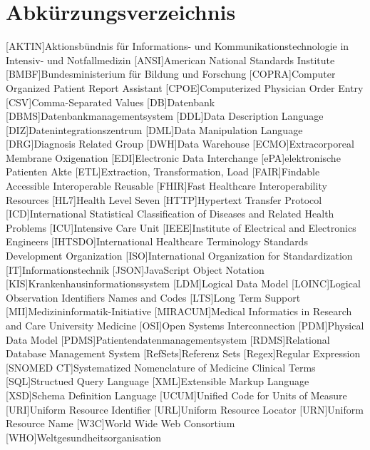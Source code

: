 \chapter*{Abkürzungsverzeichnis}

\begin{acronym}[ABK]
	[AKTIN]{Aktionsbündnis für Informations- und Kommunikationstechnologie in Intensiv- und Notfallmedizin}
	[ANSI]{American National Standards Institute}
	[BMBF]{Bundesministerium für Bildung und Forschung}
	[COPRA]{Computer Organized Patient Report Assistant}
	[CPOE]{Computerized Physician Order Entry}
	[CSV]{Comma-Separated Values}
	[DB]{Datenbank}
	[DBMS]{Datenbankmanagementsystem}
	[DDL]{Data Description Language}
	[DIZ]{Datenintegrationszentrum}
	[DML]{Data Manipulation Language}
	[DRG]{Diagnosis Related Group}
	[DWH]{Data Warehouse}
	[ECMO]{Extracorporeal Membrane Oxigenation}
	[EDI]{Electronic Data Interchange}
	[ePA]{elektronische Patienten Akte}
	[ETL]{Extraction, Transformation, Load}
	[FAIR]{Findable Accessible Interoperable Reusable}
	[FHIR]{Fast Healthcare Interoperability Resources}
	[HL7]{Health Level Seven}
	[HTTP]{Hypertext Transfer Protocol}
	[ICD]{International Statistical Classification of Diseases and Related Health Problems}
	[ICU]{Intensive Care Unit}
	[IEEE]{Institute of Electrical and Electronics Engineers}
	[IHTSDO]{International Healthcare Terminology Standards Development Organization}
	[ISO]{International Organization for Standardization}
	[IT]{Informationstechnik}
	[JSON]{JavaScript Object Notation}
	[KIS]{Krankenhausinformationssystem}
	[LDM]{Logical Data Model}
	[LOINC]{Logical Observation Identifiers Names and Codes}
	[LTS]{Long Term Support}
	[MII]{Medizininformatik-Initiative}
	[MIRACUM]{Medical Informatics in Research and Care University Medicine}
	[OSI]{Open Systems Interconnection}
	[PDM]{Physical Data Model}
	[PDMS]{Patientendatenmanagementsystem}
	[RDMS]{Relational Database Management System}
	[RefSets]{Referenz Sets}
	[Regex]{Regular Expression}
	[SNOMED CT]{Systematized Nomenclature of Medicine Clinical Terms}
	[SQL]{Structued Query Language}
	[XML]{Extensible Markup Language}
	[XSD]{Schema Definition Language}
	[UCUM]{Unified Code for Units of Measure}
	[URI]{Uniform Resource Identifier}
	[URL]{Uniform Resource Locator}
	[URN]{Uniform Resource Name}
	[W3C]{World Wide Web Consortium}
	[WHO]{Weltgesundheitsorganisation}

\end{acronym}

